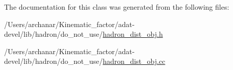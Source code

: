 The documentation for this class was generated from the following files\+:\begin{DoxyCompactItemize}
\item 
/\+Users/archanar/\+Kinematic\+\_\+factor/adat-\/devel/lib/hadron/do\+\_\+not\+\_\+use/\mbox{\hyperlink{adat-devel_2lib_2hadron_2do__not__use_2hadron__dist__obj_8h}{hadron\+\_\+dist\+\_\+obj.\+h}}\item 
/\+Users/archanar/\+Kinematic\+\_\+factor/adat-\/devel/lib/hadron/do\+\_\+not\+\_\+use/\mbox{\hyperlink{adat-devel_2lib_2hadron_2do__not__use_2hadron__dist__obj_8cc}{hadron\+\_\+dist\+\_\+obj.\+cc}}\end{DoxyCompactItemize}

